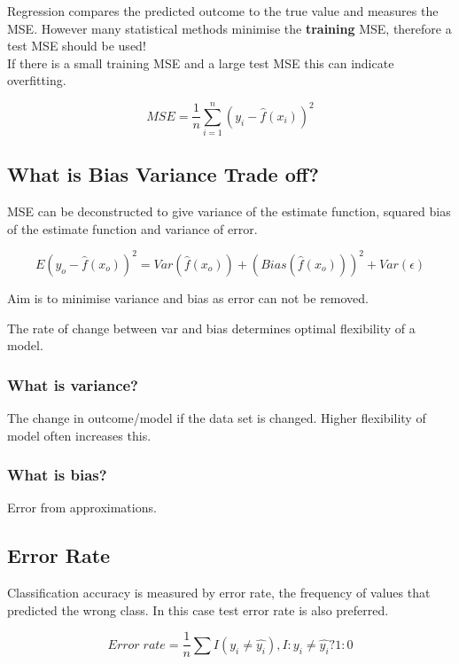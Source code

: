 \documentclass[11pt]{scrartcl} %
\begin{document}
Regression compares the predicted outcome to the true value and measures the MSE. However many
statistical methods minimise the \textbf{training} MSE, therefore a test MSE should be used!\\

If there is a small training MSE and a large test MSE this can indicate overfitting.

\begin{equation}
	MSE = \frac{1}{n}\sum^n_{i=1}{(y_i-\hat{f}(x_i))^2}
\end{equation}

\subsection{What is Bias Variance Trade off?}

MSE can be deconstructed to give variance of the estimate function, squared bias of the estimate function
and variance of error.

\begin{equation}
	E(y_o - \hat{f}(x_o))^2 = Var(\hat{f}(x_o)) + (Bias(\hat{f}(x_o)))^2 + Var(\epsilon)
\end{equation}

Aim is to minimise variance and bias as error can not be removed.

The rate of change between var and bias determines optimal flexibility of a model.

\subsubsection{What is variance?}

The change in outcome/model if the data set is changed. Higher flexibility of model often increases
this.

\subsubsection{What is bias?}

Error from approximations.

\subsection{Error Rate}

Classification accuracy is measured by error rate, the frequency of values that predicted the wrong class. In this
case test error rate is also preferred.

\begin{equation}
	Error\; rate = \frac{1}{n} \sum{I(y_i \neq \hat{y_i})} , I: y_i \neq \hat{y_i} ? 1:0
\end{equation}
\end{document}
